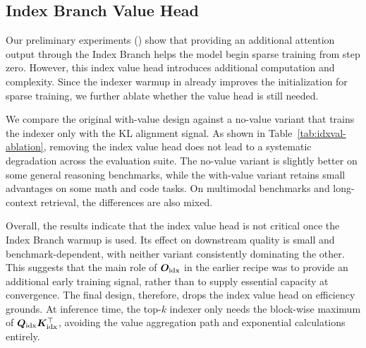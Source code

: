 \subsection{Index Branch Value Head}
\label{app:from-scratch-no-idx-value}

Our preliminary experiments () show that providing an additional attention output through the Index Branch helps the model begin sparse training from step zero. However, this index value head introduces additional computation and complexity. Since the indexer warmup in  already improves the initialization for sparse training, we further ablate whether the value head is still needed.

We compare the original with-value design against a no-value variant that trains the indexer only with the KL alignment signal. As shown in Table~\ref{tab:idxval-ablation}, removing the index value head does not lead to a systematic degradation across the evaluation suite. The no-value variant is slightly better on some general reasoning benchmarks, while the with-value variant retains small advantages on some math and code tasks. On multimodal benchmarks and long-context retrieval, the differences are also mixed.

Overall, the results indicate that the index value head is not critical once the Index Branch warmup is used. Its effect on downstream quality is small and benchmark-dependent, with neither variant consistently dominating the other.
This suggests that the main role of ${\bm{O}}_{\rm idx}$ in the earlier recipe was to provide an additional early training signal, rather than to supply essential capacity at convergence.
The final design, therefore, drops the index value head on efficiency grounds. At inference time, the top-$k$ indexer only needs the block-wise maximum of ${\bm{Q}}_{\rm idx}{\bm{K}}_{\rm idx}^{\top}$, avoiding the value aggregation path and exponential calculations entirely.
